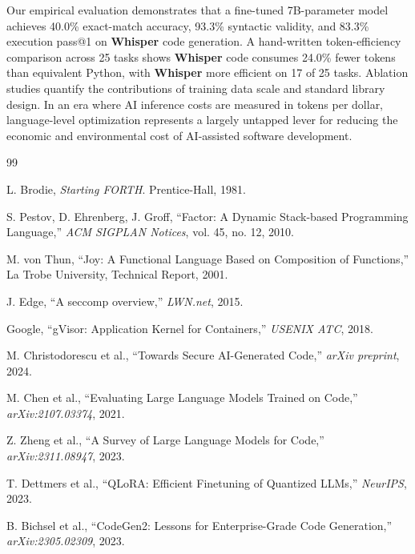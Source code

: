 \documentclass[11pt,a4paper]{article}
\begin{document}
Our empirical evaluation demonstrates that a fine-tuned 7B-parameter model
achieves 40.0\% exact-match accuracy, 93.3\% syntactic validity, and 83.3\%
execution pass@1 on \textbf{Whisper} code generation. A hand-written
token-efficiency comparison across 25 tasks shows \textbf{Whisper} code
consumes 24.0\% fewer tokens than equivalent Python, with
\textbf{Whisper} more efficient on 17 of 25 tasks. Ablation studies quantify
the contributions of training data scale and standard library design. In an era where AI inference costs are
measured in tokens per dollar, language-level optimization represents a
largely untapped lever for reducing the economic and environmental cost of
AI-assisted software development.


\begin{thebibliography}{99}

L. Brodie, \textit{Starting FORTH}. Prentice-Hall, 1981.

S. Pestov, D. Ehrenberg, J. Groff, ``Factor: A Dynamic Stack-based
Programming Language,'' \textit{ACM SIGPLAN Notices}, vol. 45, no. 12, 2010.

M. von Thun, ``Joy: A Functional Language Based on Composition of Functions,''
La Trobe University, Technical Report, 2001.

J. Edge, ``A seccomp overview,'' \textit{LWN.net}, 2015.

Google, ``gVisor: Application Kernel for Containers,''
\textit{USENIX ATC}, 2018.

M. Christodorescu et al., ``Towards Secure AI-Generated Code,'' \textit{arXiv
  preprint}, 2024.

M. Chen et al., ``Evaluating Large Language Models Trained on Code,''
\textit{arXiv:2107.03374}, 2021.

Z. Zheng et al., ``A Survey of Large Language Models for Code,''
\textit{arXiv:2311.08947}, 2023.

T. Dettmers et al., ``QLoRA: Efficient Finetuning of Quantized LLMs,''
\textit{NeurIPS}, 2023.

B. Bichsel et al., ``CodeGen2: Lessons for Enterprise-Grade Code Generation,''
\textit{arXiv:2305.02309}, 2023.

\end{thebibliography}
\end{document}
